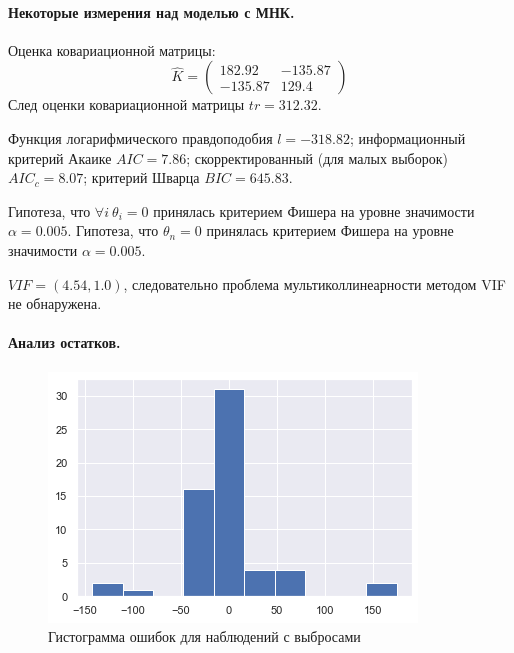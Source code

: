 \documentclass[a4paper,12pt]{article}
\begin{document}
\paragraph{Некоторые измерения над моделью с МНК.\\}
Оценка ковариационной матрицы:
$$ \hat{K} = 
\begin{pmatrix}
    182.92 & -135.87\\
    -135.87 & 129.4
\end{pmatrix}
$$
След оценки ковариационной матрицы $tr = 312.32$.

Функция логарифмического правдоподобия $l = -318.82$; информационный критерий Акаике $AIC = 7.86$; скорректированный (для малых выборок) $AIC_c = 8.07$; критерий Шварца $BIC = 645.83$.

Гипотеза, что $\forall i~\theta_i=0$ принялась критерием Фишера на уровне значимости $\alpha = 0.005$.
Гипотеза, что $\theta_n = 0$ принялась критерием Фишера на уровне значимости $\alpha = 0.005$.

$VIF = (4.54, 1.0)$, следовательно проблема мультиколлинеарности методом VIF не обнаружена.


\paragraph{Анализ остатков.\\}
\begin{figure}
    \vspace{-2ex}
    \includegraphics[width=\linewidth]{src/img/гистограмма_ошибок_наблюдения_с_выбросами.png}
    \caption{Гистограмма ошибок для наблюдений с выбросами}
\end{figure}
\end{document}

